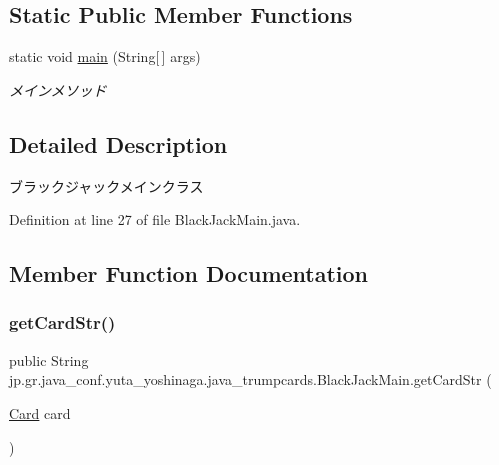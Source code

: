 \subsection*{Static Public Member Functions}
\begin{DoxyCompactItemize}
\item 
static void \hyperlink{classjp_1_1gr_1_1java__conf_1_1yuta__yoshinaga_1_1java__trumpcards_1_1_black_jack_main_af395b1fc47f9ef84101a3c13c2310ed6}{main} (String\mbox{[}$\,$\mbox{]} args)
\begin{DoxyCompactList}\small\item\em メインメソッド \end{DoxyCompactList}\end{DoxyCompactItemize}


\subsection{Detailed Description}
ブラックジャックメインクラス 

Definition at line 27 of file Black\+Jack\+Main.\+java.



\subsection{Member Function Documentation}
\mbox{\label{classjp_1_1gr_1_1java__conf_1_1yuta__yoshinaga_1_1java__trumpcards_1_1_black_jack_main_a1f14eabe7d9a1438959860e323c39a6f}} 
\subsubsection{\texorpdfstring{get\+Card\+Str()}{getCardStr()}}
{\footnotesize\ttfamily public String jp.\+gr.\+java\+\_\+conf.\+yuta\+\_\+yoshinaga.\+java\+\_\+trumpcards.\+Black\+Jack\+Main.\+get\+Card\+Str (\begin{DoxyParamCaption}\item[{\hyperlink{classjp_1_1gr_1_1java__conf_1_1yuta__yoshinaga_1_1java__trumpcards_1_1_card}{Card}}]{card }\end{DoxyParamCaption})}



